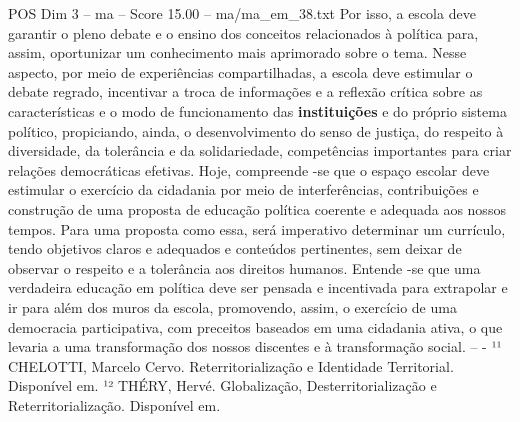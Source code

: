 \begin{textsample}{POS Dim 3 – ma – Score 15.00 – ma/ma\_em\_38.txt}
Por isso, a escola deve garantir o pleno debate e o ensino dos conceitos relacionados à política para, assim, oportunizar um conhecimento mais aprimorado sobre o tema.
Nesse aspecto, por meio de experiências compartilhadas, a escola deve estimular o debate regrado, incentivar a troca de informações e a reflexão crítica sobre as características e o modo de funcionamento das \textbf{instituições} e do próprio sistema político, propiciando, ainda, o desenvolvimento do senso de justiça, do respeito à diversidade, da tolerância e da solidariedade, competências importantes para criar relações democráticas efetivas.
Hoje, compreende -se que o espaço escolar deve estimular o exercício da cidadania por meio de interferências, contribuições e construção de uma proposta de educação política coerente e adequada aos nossos tempos.
Para uma proposta como essa, será imperativo determinar um currículo, tendo objetivos claros e adequados e conteúdos pertinentes, sem deixar de observar o respeito e a tolerância aos direitos humanos.
Entende -se que uma verdadeira educação em política deve ser pensada e incentivada para extrapolar e ir para além dos muros da escola, promovendo, assim, o exercício de uma democracia participativa, com preceitos baseados em uma cidadania ativa, o que levaria a uma transformação dos nossos discentes e à transformação social. -- - ¹¹ CHELOTTI, Marcelo Cervo.
Reterritorialização e Identidade Territorial.
Disponível em. ¹² THÉRY, Hervé.
Globalização, Desterritorialização e Reterritorialização.
Disponível em.

\end{textsample}
